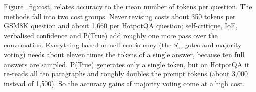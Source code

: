 Figure~\ref{fig:cost} relates accuracy to the mean number of tokens per question. The methods fall into two cost groups. Never revising costs about 350 tokens per GSM8K question and about 1{,}660 per HotpotQA question; self-critique, IoE, verbalised confidence and P(True) add roughly one more pass over the conversation. Everything based on self-consistency (the $S_{\text{sc}}$ gates and majority voting) needs about eleven times the tokens of a single answer, because ten full answers are sampled. P(True) generates only a single token, but on HotpotQA it re-reads all ten paragraphs and roughly doubles the prompt tokens (about 3{,}000 instead of 1{,}500). So the accuracy gains of majority voting come at a high cost.
